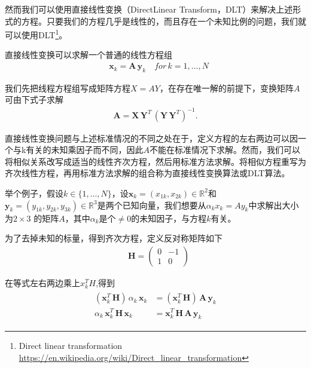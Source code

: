 然而我们可以使用直接线性变换（DirectLinear Transform，DLT）来解决上述形式的方程。只要我们的方程几乎是线性的，而且存在一个未知比例的问题，我们就可以使用DLT\footnote{Direct linear transformation \quad \url{https://en.wikipedia.org/wiki/Direct_linear_transformation}}。

直接线性变换可以求解一个普通的线性方程组
\begin{align}
&{\displaystyle \mathbf {x} _{k}=\mathbf {A} \,\mathbf {y} _{k}}  \quad for {\displaystyle \,k=1,\ldots ,N}
\end{align}

我们先把线程方程组写成矩阵方程$X=AY$，在存在唯一解的前提下，变换矩阵$A$可由下式子求解
\begin{align}
{\mathbf  {A}}={\mathbf  {X}}\,{\mathbf  {Y}}^{{T}}\,({\mathbf  {Y}}\,{\mathbf  {Y}}^{{T}})^{{-1}}.
\end{align}

直接线性变换问题与上述标准情况的不同之处在于，定义方程的左右两边可以因一个与k有关的未知乘因子而不同，因此$A$不能在标准情况下求解。然而，我们可以将相似关系改写成适当的线性齐次方程，然后用标准方法求解。将相似方程重写为齐次线性方程，再用标准方法求解的组合称为直接线性变换算法或DLT算法。

举个例子，假设$k \in \{1,...,N\}$，设${\displaystyle \mathbf {x} _{k}=(x_{1k},x_{2k})\in \mathbb {R} ^{2}} $和${\displaystyle \mathbf {y} _{k}=(y_{1k},y_{2k},y_{3k})\in \mathbb {R} ^{3}}$是两个已知向量，我们想要从$\alpha_k x_k = A y_k$中求解出大小为$2 \times 3$ 的矩阵$A$，其中$\alpha_k$是个$\neq 0$的未知因子，与方程$k$有关。

为了去掉未知的标量，得到齐次方程，定义反对称矩阵如下
\begin{align}
& {\mathbf  {H}}={\begin{pmatrix}0&-1\\1&0\end{pmatrix}}
\end{align}

在等式左右两边乘上$x_k^TH$,得到
\begin{align}
{\displaystyle {\begin{aligned}(\mathbf {x} _{k}^{T}\,\mathbf {H} )\,\alpha _{k}\,\mathbf {x} _{k}&=(\mathbf {x} _{k}^{T}\,\mathbf {H} )\,\mathbf {A} \,\mathbf {y} _{k}\\\alpha _{k}\,\mathbf {x} _{k}^{T}\,\mathbf {H} \,\mathbf {x} _{k}&=\mathbf {x} _{k}^{T}\,\mathbf {H} \,\mathbf {A} \,\mathbf {y} _{k}\end{aligned}}}
\end{align}

